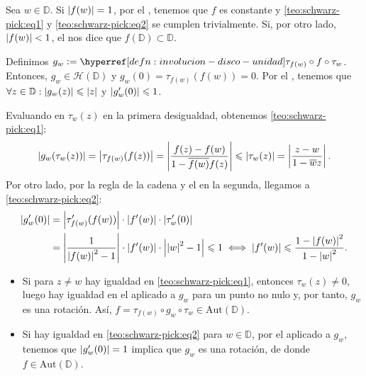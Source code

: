 \begin{dem}
    Sea $w \in \mathbb{D}$. Si $\left|f(w)\right| = 1$, por el , tenemos que $f$ es constante y \ref{teo:schwarz-pick:eq1} y \ref{teo:schwarz-pick:eq2} se cumplen trivialmente. Si, por otro lado, $\left|f(w)\right| < 1$, el  nos dice que $f(\mathbb{D}) \subset \mathbb{D}$.

    Definimos $g_w \defeq \exhyperref[defn:involucion-disco-unidad]{involucion-disco-unidad}{\tau_{f(w)}} \circ f \circ \tau_w$. Entonces, $g_w \in \mathcal{H} \left(\mathbb{D}\right)$ y $g_w(0) = \tau_{f(w)}(f(w)) = 0$. Por el , tenemos que $\forall z \in \mathbb{D} : \left|g_w(z)\right| \leqslant \left|z\right|$ y $\left|g_w'(0)\right| \leqslant 1$.

    Evaluando en $\tau_w(z)$ en la primera desigualdad, obtenemos \ref{teo:schwarz-pick:eq1}:
    \[
    \left|g_w(\tau_w(z))\right| = \left|\tau_{f(w)}(f(z))\right| = \left|\frac{f(z) - f(w)}{1 - \overline{f(w)} f(z)}\right| \leqslant \left|\tau_w(z)\right| = \left|\frac{z - w}{1 - \overline{w} z}\right|.
    \]
    Por otro lado, por la regla de la cadena y el  en la segunda, llegamos a \ref{teo:schwarz-pick:eq2}:
    \[
    \begin{aligned}
        \left|g_w'(0)\right| &= \left|\tau_{f(w)}'(f(w))\right| \cdot \left|f'(w)\right| \cdot \left|\tau_w'(0)\right| \\
        &= \left|\frac{1}{\left|f(w)\right|^2 - 1}\right| \cdot \left|f'(w)\right| \cdot \left|\left|w\right|^2 - 1\right| \leqslant 1 \iff \left|f'(w)\right| \leqslant \frac{1 - \left|f(w)\right|^2}{1 - \left|w\right|^2}.
    \end{aligned}
    \]

    \begin{itemize}[wide, labelindent=0pt]
        \item[$\text{\ref{teo:schwarz-pick:i}} \!\Rightarrow \!\text{\ref{teo:schwarz-pick:v}}$:] Si para $z \neq w$ hay igualdad en \ref{teo:schwarz-pick:eq1}, entonces $\tau_{w}(z) \neq 0$, luego hay igualdad en el  aplicado a $g_w$ para un punto no nulo y, por tanto, $g_w$ es una rotación. Así, $f = \tau_{f(w)} \circ g_w \circ \tau_{w} \in \mathrm{Aut}\left(\mathbb{D}\right)$.

        \item[$\text{\ref{teo:schwarz-pick:iii}} \!\Rightarrow \!\text{\ref{teo:schwarz-pick:v}}$:] Si hay igualdad en \ref{teo:schwarz-pick:eq2} para $w \in \mathbb{D}$, por el  aplicado a $g_w$, tenemos que $\left|g_w'(0)\right| = 1$ implica que $g_w$ es una rotación, de donde $f \in \mathrm{Aut}\left(\mathbb{D}\right)$.


\end{itemize}
\end{dem}

